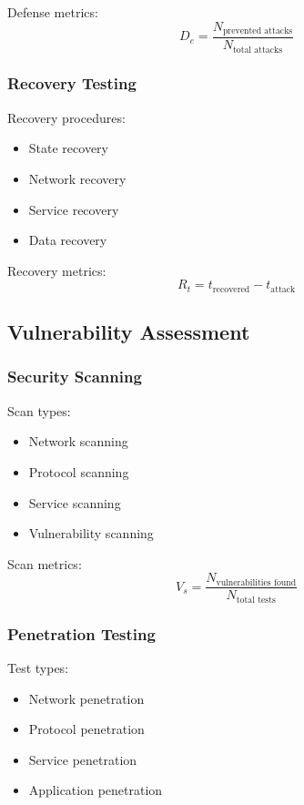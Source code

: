 \documentclass[12pt]{article}
\begin{document}
Defense metrics:
\begin{equation}
D_e = \frac{N_{\text{prevented attacks}}}{N_{\text{total attacks}}}
\end{equation}

\subsubsection{Recovery Testing}

Recovery procedures:
\begin{itemize}
\item State recovery
\item Network recovery
\item Service recovery
\item Data recovery
\end{itemize}

Recovery metrics:
\begin{equation}
R_t = t_{\text{recovered}} - t_{\text{attack}}
\end{equation}

\subsection{Vulnerability Assessment}

\subsubsection{Security Scanning}

Scan types:
\begin{itemize}
\item Network scanning
\item Protocol scanning
\item Service scanning
\item Vulnerability scanning
\end{itemize}

Scan metrics:
\begin{equation}
V_s = \frac{N_{\text{vulnerabilities found}}}{N_{\text{total tests}}}
\end{equation}

\subsubsection{Penetration Testing}

Test types:
\begin{itemize}
\item Network penetration
\item Protocol penetration
\item Service penetration
\item Application penetration
\end{itemize}
\end{document}
